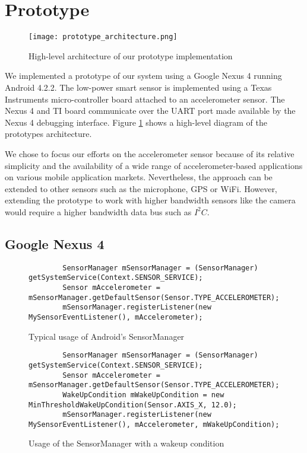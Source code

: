 
\section{Prototype}
\label{sec:prototype}

\begin{figure}[t]
	\texttt{[image: prototype\_architecture.png]}
	\caption{High-level architecture of our prototype implementation}
    \label{fig:prototypeArchitecture}
\end{figure}

We implemented a prototype of our system using a Google Nexus 4 running Android 4.2.2. The low-power smart sensor is implemented using a Texas Instruments micro-controller board attached to an accelerometer sensor. The Nexus 4 and TI board communicate over the UART port made available by the Nexus 4 debugging interface. Figure \ref{fig:prototypeArchitecture} shows a high-level diagram of the prototypes architecture.

We chose to focus our efforts on the accelerometer sensor because of its relative simplicity and the availability of a wide range of accelerometer-based applications on various mobile application markets. Nevertheless, the approach can be extended to other sensors such as the microphone, GPS or WiFi. However, extending the prototype to work with higher bandwidth sensors like the camera would require a higher bandwidth data bus such as $I^2C$. 


\subsection{Google Nexus 4}

\begin{figure*}[t]
	\begin{verbatim}
		SensorManager mSensorManager = (SensorManager) getSystemService(Context.SENSOR_SERVICE);
		Sensor mAccelerometer = mSensorManager.getDefaultSensor(Sensor.TYPE_ACCELEROMETER);
		mSensorManager.registerListener(new MySensorEventListener(), mAccelerometer);
	\end{verbatim}
	\caption{Typical usage of Android's SensorManager}
    \label{fig:androidSensorCodeNormal}
\end{figure*}

\begin{figure*}[t]
	\begin{verbatim}
		SensorManager mSensorManager = (SensorManager) getSystemService(Context.SENSOR_SERVICE);
		Sensor mAccelerometer = mSensorManager.getDefaultSensor(Sensor.TYPE_ACCELEROMETER);
		WakeUpCondition mWakeUpCondition = new MinThresholdWakeUpCondition(Sensor.AXIS_X, 12.0);
		mSensorManager.registerListener(new MySensorEventListener(), mAccelerometer, mWakeUpCondition);
	\end{verbatim}
	\caption{Usage of the SensorManager with a wakeup condition}
    \label{fig:androidSensorCodeModified}
\end{figure*}

